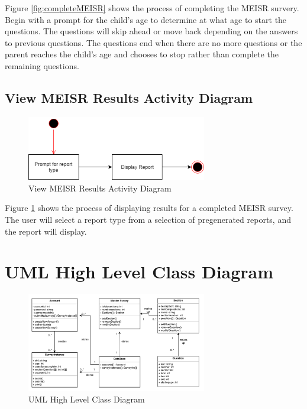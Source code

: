Figure \ref{fig:completeMEISR} shows the process of completing the MEISR survery. Begin with a prompt for the child's age to determine at what age to start the questions. The questions will skip ahead or move back depending on the answers to previous questions. The questions end when there are no more questions or the parent reaches the child's age and chooses to stop rather than complete the remaining questions.

\subsection{View MEISR Results Activity Diagram}

\begin{figure}[h]
  \centering
  \includegraphics[width=0.7\textwidth]{images/View_MEISR_Results_Activity_Diagram.png}
  \caption{View MEISR Results Activity Diagram}
  \label{fig:viewMEISRResults}
\end{figure}
  
  Figure \ref{fig:viewMEISRResults} shows the process of displaying results for a completed MEISR survey. The user will select a report type from a selection of pre\-generated reports, and the report will display.
  
\section{UML High Level Class Diagram}

\begin{figure}[h]
  \centering
  \includegraphics[width=0.7\textwidth]{images/HighLevelClassDiagramCS495.png}
  \caption{UML High Level Class Diagram}
  \label{fig:classDiagram}
\end{figure}

